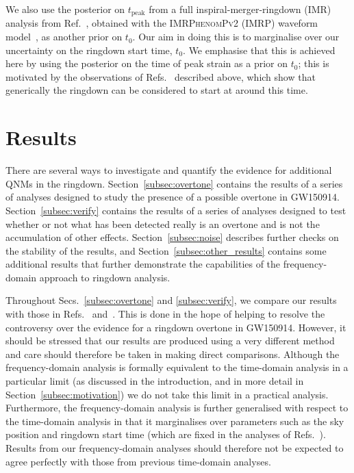 We also use the posterior on $t_\mathrm{peak}$ from a full inspiral-merger-ringdown (IMR) analysis from Ref.~\cite{Isi:2022mhy}, obtained with the \textsc{IMRPhenomPv2} (IMRP) waveform model~\cite{Hannam:2013oca}, as another prior on $t_0$. 
Our aim in doing this is to marginalise over our uncertainty on the ringdown start time, $t_0$. 
We emphasise that this is achieved here by using the posterior on the time of peak strain as a prior on $t_0$; this is motivated by the observations of Refs.~\cite{Giesler:2019uxc, Bhagwat:2019dtm, Ota:2019bzl, Cook:2020otn, JimenezForteza:2020cve, Dhani:2020nik, Finch:2021iip, Forteza:2021wfq, Dhani:2021vac, MaganaZertuche:2021syq} described above, which show that generically the ringdown can be considered to start at around this time.


\section{Results}\label{sec:results}

There are several ways to investigate and quantify the evidence for additional QNMs in the ringdown.
Section~\ref{subsec:overtone} contains the results of a series of analyses designed to study the presence of a possible overtone in GW150914.
Section~\ref{subsec:verify} contains the results of a series of analyses designed to test whether or not what has been detected really is an overtone and is not the accumulation of other effects.
Section~\ref{subsec:noise} describes further checks on the stability of the results, and Section~\ref{subsec:other_results} contains some additional results that further demonstrate the capabilities of the frequency-domain approach to ringdown analysis.

Throughout Secs.~\ref{subsec:overtone} and \ref{subsec:verify}, we compare our results with those in Refs.~\cite{Cotesta:2022pci} and~\cite{Isi:2022mhy}. 
This is done in the hope of helping to resolve the controversy over the evidence for a ringdown overtone in GW150914. 
However, it should be stressed that our results are produced using a very different method and care should therefore be taken in making direct comparisons.
Although the frequency-domain analysis is formally equivalent to the time-domain analysis in a particular limit (as discussed in the introduction, and in more detail in Section~\ref{subsec:motivation}) we do not take this limit in a practical analysis. Furthermore, the frequency-domain analysis is further generalised with respect to the time-domain analysis in that it marginalises over parameters such as the sky position and ringdown start time (which are fixed in the analyses of Refs.~\cite{Cotesta:2022pci, Isi:2022mhy}).
Results from our frequency-domain analyses should therefore not be expected to agree perfectly with those from previous time-domain analyses.

